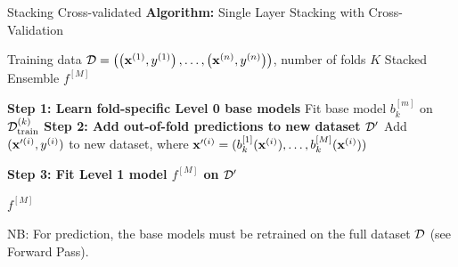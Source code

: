 \documentclass[11pt,compress,t,notes=noshow, xcolor=table]{beamer}
\begin{document}
\begin{vbframe}{Stacking Cross-validated}
\footnotesize
\textbf{Algorithm:} Single Layer Stacking with Cross-Validation
\begin{algorithmic}
    \Require Training data $\mathcal{D} = \left( \left(\mathbf{x}^{(1)}, y^{(1)}\right), \ldots, \left(\mathbf{x}^{(n)}, y^{(n)}\right)\right)$, number of folds $K$
    \Ensure Stacked Ensemble $f^{[M]}$

        \State \textbf{Step 1: Learn fold-specific Level 0 base models}
            \State Fit base model $b_k^{[m]}$ on $\mathcal{D}_{\mathrm{train}}^{(k)}$
        \EndFor
        \State
        \State \textbf{Step 2: Add out-of-fold predictions to new dataset $\mathcal{D}^\prime$}
            \State Add $(\mathbf{x}^{\prime(i)}, y^{(i)})$ to new dataset, where $\mathbf{x}^{\prime(i)} = (b_k^{[1]}(\mathbf{x}^{(i)}), \ldots, b_k^{[M]}(\mathbf{x}^{(i)}))$
        \EndFor
    \EndFor

    \State
    \State \textbf{Step 3: Fit Level 1 model $f^{[M]}$ on $\mathcal{D}^\prime$}

    \State \Return $f^{[M]}$
\end{algorithmic}
NB: For prediction, the base models must be retrained on the full dataset $\mathcal{D}$ (see Forward Pass).

\end{vbframe}

\end{document}
